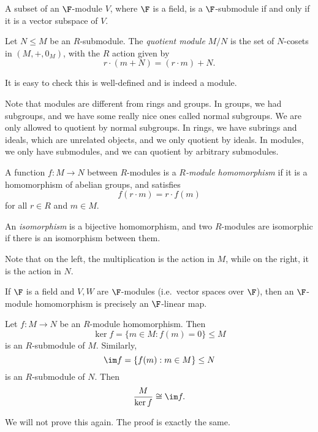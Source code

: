 \documentclass[a4paper]{article}
\begin{document}
\begin{eg}
  A subset of an $\F$-module $V$, where $\F$ is a field, is a $\F$-submodule if and only if it is a vector subspace of $V$.
\end{eg}

\begin{defi}
  Let $N \leq M$ be an $R$-submodule. The \emph{quotient module} $M/N$ is the set of $N$-cosets in $(M, +, 0_M)$, with the $R$ action given by
  \[
    r\cdot (m + N) = (r\cdot m) + N.
  \]
\end{defi}
It is easy to check this is well-defined and is indeed a module.

Note that modules are different from rings and groups. In groups, we had subgroups, and we have some really nice ones called normal subgroups. We are only allowed to quotient by normal subgroups. In rings, we have subrings and ideals, which are unrelated objects, and we only quotient by ideals. In modules, we only have submodules, and we can quotient by arbitrary submodules.

\begin{defi}
  A function $f: M \to N$ between $R$-modules is a \emph{$R$-module homomorphism} if it is a homomorphism of abelian groups, and satisfies
  \[
    f(r \cdot m) = r \cdot f(m)
  \]
  for all $r \in R$ and $m \in M$.

  An \emph{isomorphism} is a bijective homomorphism, and two $R$-modules are isomorphic if there is an isomorphism between them.
\end{defi}
Note that on the left, the multiplication is the action in $M$, while on the right, it is the action in $N$.

\begin{eg}
  If $\F$ is a field and $V, W$ are $\F$-modules (i.e.\ vector spaces over $\F$), then an $\F$-module homomorphism is precisely an $\F$-linear map.
\end{eg}

\begin{thm}
  Let $f: M \to N$ be an $R$-module homomorphism. Then
  \[
    \ker f = \{m \in M: f(m) = 0\} \leq M
  \]
  is an $R$-submodule of $M$. Similarly,
  \[
    \im f = \{f(m): m \in M\}\leq N
  \]
  is an $R$-submodule of $N$. Then
  \[
    \frac{M}{\ker f} \cong \im f.
  \]
\end{thm}

We will not prove this again. The proof is exactly the same.
\end{document}
